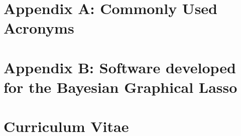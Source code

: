 \documentclass[final]{ulthesis}
\begin{document}
\chapter{Appendix A: Commonly Used Acronyms}


\chapter{Appendix B: Software developed for the Bayesian Graphical Lasso}


\chapter{Curriculum Vitae}
\begin{DoubleSpace*}

\end{DoubleSpace*}
\end{document}

